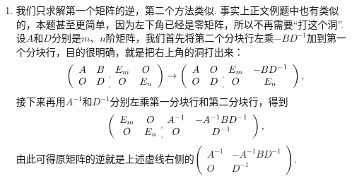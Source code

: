 \begin{enumerate}
    \item 我们只求解第一个矩阵的逆，第二个方法类似. 事实上正文例题中也有类似的，本题甚至更简单，因为左下角已经是零矩阵，所以不再需要``打这个洞''. 设$A$和$D$分别是$m$、$n$阶矩阵，我们首先将第二个分块行左乘$-BD^{-1}$加到第一个分块行，目的很明确，就是把右上角的洞打出来：
    \[\left(\begin{array}{cc:cc}
        A & B & E_m & O \\ O & D & O & E_n
    \end{array}\right)\rightarrow\left(\begin{array}{cc:cc}
        A & O & E_m & -BD^{-1} \\ O & D & O & E_n
    \end{array}\right),\]
    接下来再用$A^{-1}$和$D^{-1}$分别左乘第一分块行和第二分块行，得到
    \[\left(\begin{array}{cc:cc}
        E_m & O & A^{-1} & -A^{-1}BD^{-1} \\ O & E_n & O & D^{-1}
    \end{array}\right),\]
    由此可得原矩阵的逆就是上述虚线右侧的$\begin{pmatrix}
            A^{-1} & -A^{-1}BD^{-1} \\ O & D^{-1}
        \end{pmatrix}$.
\end{enumerate}

